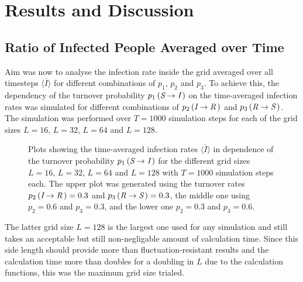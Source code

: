 \section{Results and Discussion}

\subsection{Ratio of Infected People Averaged over Time}

{Aim was now to analyse the infection rate inside the grid averaged over all timesteps $\overline{\langle I\rangle}$ for different combinations of $p_1$, $p_2$ and $p_3$. To achieve this, the dependency of the 
turnover probability $p_1\left(\textit{S}\rightarrow\textit{I}\,\right)$ on the time-averaged infection rates was simulated for different combinations of $p_2\left(\textit{I}\rightarrow\textit{R}\,\right)$
and $p_3\left(\textit{R}\rightarrow\textit{S}\,\right)$. The simulation was performed over $T=1000$ simulation steps for each of the grid sizes $L=16$, $L=32$, $L=64$ and $L=128$.\parfillskip=0pt\par}

\begin{figure}[H]
    \centering
    \resizebox{\textwidth}{!}{}
    \caption{Plots showing the time-averaged infection rates $\overline{\langle I\rangle}$ in dependence of the turnover probability $p_1\left(\textit{S}\rightarrow\textit{I}\,\right)$
    for the different grid sizes $L=16$, $L=32$, $L=64$ and $L=128$ with $T=1000$ simulation steps each. The upper plot was generated using the turnover rates 
    $p_2\left(\textit{I}\rightarrow\textit{R}\,\right)=0.3$ and $p_3\left(\textit{R}\rightarrow\textit{S}\,\right)=0.3$, 
    the middle one using $p_2=0.6$ and $p_3=0.3$, and the lower one $p_2=0.3$ and $p_3=0.6$.}\label{fig:res_dis_avg_inf_over_p1}
\end{figure}

The latter grid size $L=128$ is the largest one used for any simulation and still takes an acceptable but still non-negligable amount of calculation time.
Since this side length should provide more than fluctuation-resistant results and the calculation time more than doubles for a doubling in $L$ due to the calculation functions, this was the maximum grid size trialed.

